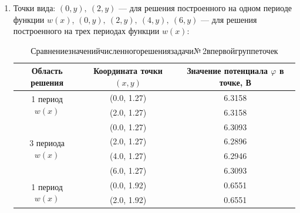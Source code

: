 \documentclass[12pt, a4paper]{article}
\renewcommand{\phi}{\varphi}
\begin{document}
				\begin{enumerate}
					\item Точки вида: $(0, y),\ (2, y)$ --- для решения построенного на одном периоде функции $w(x)$,
					$(0, y),\ (2, y),\ (4, y),\ (6, y)$ --- для решения построенного на трех периодах функции $w(x)$:	
				
					\begin{table}[!h]
						\centering
						\caption{ Сравнение\;значений\;численного\;решения\;задачи\;№\,2\;в\;первой\;группе\;точек 
						}
						\vspace*{2mm}
						\begin{tabular}{|c|c|c|}
							\hline
							Область решения
							& Координата точки $(x, y)$
							& Значение потенциала $\phi$ в точке, В\\
							
							\hline
							\hline
							
							\multirow{2}{*}{1 период $w(x)$}  
							& (0.0, 1.27)                                                      
							& 6.3158	\\ \cline{2-3} 
							
							& (2.0, 1.27)                                                      
							& 6.3158	\\ \hline
							
							
							\multirow{4}{*}{3 периода $w(x)$} 
							& (0.0, 1.27)                                                     
							& 6.3093	\\ \cline{2-3} 
							
							& (2.0, 1.27)                                                      
							& 6.2896	\\ \cline{2-3} 
							
							& (4.0, 1.27)                                                      
							& 6.2946    \\ \cline{2-3} 
							
							& (6.0, 1.27)                                                      
							& 6.3093	
							\\ 
							
							\hline
							\hline
							
							\multirow{2}{*}{1 период $w(x)$}  
							& (0.0, 1.92)                                                      
							& 0.6551	\\ \cline{2-3} 
							& (2.0, 1.92)   
							& 0.6551	\\ 
							

\end{tabular}
\end{table}
\end{enumerate}
\end{document}
